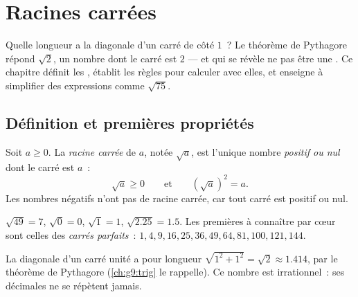 \chapter{Racines carrées}\label{ch:g9:sqrt}

Quelle longueur a la diagonale d'un carré de côté $1$~? Le théorème de
Pythagore répond $\sqrt 2$, un nombre dont le carré est $2$ --- et qui
se révèle ne pas être une . Ce chapitre définit les , établit les règles pour calculer avec elles, et enseigne à
simplifier des expressions comme $\sqrt{75}$.

\section{Définition et premières propriétés}

\begin{definition}\label{def:g9:sqrt:def}
Soit $a \geq 0$. La \emph{racine carrée} de $a$,
notée $\sqrt a$, est l'unique nombre \emph{positif ou nul} dont le
carré est $a$~:
\[
\sqrt a \geq 0
\qquad\text{et}\qquad
\left(\sqrt a\right)^2 = a .
\]
Les nombres négatifs n'ont pas de racine carrée, car tout carré est
positif ou nul.
\end{definition}

\begin{example}
$\sqrt{49} = 7$, $\sqrt 0 = 0$, $\sqrt 1 = 1$,
$\sqrt{2.25} = 1.5$. Les premières  à connaître par
cœur sont celles des \emph{carrés parfaits}~: $1, 4, 9, 16, 25, 36, 49,
64, 81, 100, 121, 144$.
\end{example}

\begin{omfigure}

{\small La diagonale d'un carré unité a pour longueur $\sqrt{1^2 + 1^2}
= \sqrt2 \approx 1.414$, par le théorème de Pythagore
(\cref{ch:g9:trig} le rappelle). Ce nombre est irrationnel~: ses
décimales ne se répètent jamais.}
\end{omfigure}

